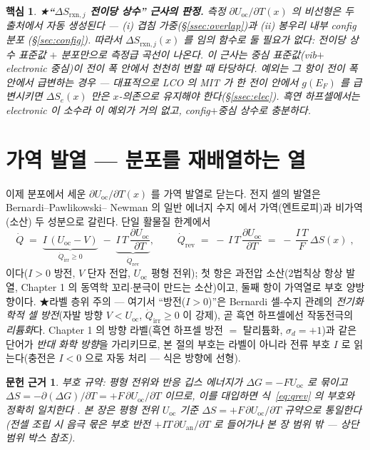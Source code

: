 \documentclass[11pt,a4paper]{article}
\newtheorem*{keybox}{핵심}
\newtheorem*{srcbox}{문헌 근거}
\newcommand{\rxn}{\mathrm{rxn}}
\newcommand{\rev}{\mathrm{rev}}
\newcommand{\irr}{\mathrm{irr}}
\newcommand{\oc}{\mathrm{oc}}
\begin{document}
\begin{keybox}
★\textbf{``$\Delta S_{\rxn,j}$ 전이당 상수'' 근사의 판정.} 측정 $\partial U_\oc/\partial T(x)$ 의 비선형은 두
출처에서 \emph{자동 생성}된다 — (i) 겹침 가중(\S\ref{ssec:overlap})과 (ii) 봉우리 내부 config 분포
(\S\ref{sec:config}). 따라서 $\Delta S_{\rxn,j}(x)$ 를 임의 함수로 둘 필요가 \emph{없다}: 전이당 \emph{상수}
표준값 $+$ 분포만으로 측정급 곡선이 나온다. 이 근사는 \emph{중심 표준값(vib$+$electronic 중심)이 전이 폭 안에서
천천히 변할 때} 타당하다. 예외는 그 항이 전이 폭 \emph{안에서} 급변하는 경우 — 대표적으로 LCO 의 MIT 가 한
전이 안에서 $g(E_F)$ 를 급변시키면 $\Delta S_e(x)$ 만은 $x$-의존으로 유지해야 한다(\S\ref{ssec:elec}). 흑연
하프셀에서는 electronic 이 소수라 이 예외가 거의 없고, config$+$중심 상수로 충분하다.
\end{keybox}

\section{가역 발열 — 분포를 재배열하는 열}\label{sec:revheat}
이제 분포에서 세운 $\partial U_\oc/\partial T(x)$ 를 가역 발열로 닫는다. 전지 셀의 발열은 Bernardi--Pawlikowski--
Newman 의 일반 에너지 수지 \cite{bernardi1985} 에서 가역(엔트로피)과 비가역(소산) 두 성분으로 갈린다. 단일
활물질 한계에서
\begin{equation}
\dot Q \;=\; \underbrace{I\,(U_\oc-V)}_{\dot Q_\irr\ge0}\;-\;\underbrace{I\,T\,\frac{\partial U_\oc}{\partial T}}_{\dot Q_\rev},
\qquad
\boxed{\;\dot Q_\rev \;=\; -\,I\,T\,\frac{\partial U_\oc}{\partial T}\;=\;-\,\frac{I\,T}{F}\,\Delta S(x)\;,}
\label{eq:qrev}
\end{equation}
이다($I>0$ 방전, $V$ 단자 전압, $U_\oc$ 평형 전위); 첫 항은 과전압 소산(2법칙상 항상 발열, Chapter 1 의
동역학 꼬리$\cdot$분극이 만드는 소산)이고, 둘째 항이 가역열로 부호 양방향이다.
★라벨 층위 주의 — 여기서 ``방전($I>0$)''은 Bernardi 셀-수지 관례의 \emph{전기화학적 셀 방전}(자발 방향
$V<U_\oc$, $\dot Q_\irr\ge0$ 이 강제), 곧 흑연 하프셀에선 작동전극의 \emph{리튬화}다. Chapter 1 의 방향
라벨(흑연 하프셀 방전 $=$ 탈리튬화, $\sigma_d{=}+1$)과 같은 단어가 \emph{반대 화학 방향}을 가리키므로,
본 절의 부호는 라벨이 아니라 전류 부호 $I$ 로 읽는다(충전은 $I<0$ 으로 자동 처리 — 식은 방향에 선형).
\begin{srcbox}
부호 규약: 평형 전위와 반응 깁스 에너지가 $\Delta G=-FU_\oc$ 로 묶이고 $\Delta S=-\partial(\Delta G)/\partial T
=+F\,\partial U_\oc/\partial T$ 이므로, 이를 대입하면 식~\eqref{eq:qrev} 의 부호와 정확히 일치한다 \cite{newman,msmr_partI}. 본 장은 평형 전위 $U_\oc$ 기준 $\Delta S=+F\,\partial U_\oc/\partial T$ 규약으로 통일한다(전셀 조립 시 음극 몫은 부호 반전 $+IT\,\partial U_\mathrm{an}/\partial T$ 로 들어가나 본 장 범위 밖 — 상단 범위 박스 참조).
\end{srcbox}
\end{document}

